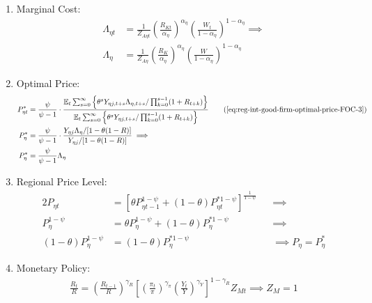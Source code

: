 \documentclass[../thesis.tex]{subfiles}
\begin{document}
\begin{enumerate}
	\item Marginal Cost:
	\begin{align}
		\Lambda_{\eta t} &= \frac{1}{Z_{A\eta t}} \left( \frac{R_{Kt}}{{\alpha_{\eta}}} \right)^{{\alpha_{\eta}}} \left( \frac{W_t}{1-{\alpha_{\eta}}} \right)^{1-{\alpha_{\eta}}} \implies \nonumber \\
		\Lambda_{\eta} &= \frac{1}{Z_{A\eta}} \left( \frac{R_K}{{\alpha_{\eta}}} \right)^{{\alpha_{\eta}}} \left( \frac{W}{1-{\alpha_{\eta}}} \right)^{1-{\alpha_{\eta}}} \label{eq:reg-ss-int-good-firm-MC-2}
	\end{align}
	
	\item Optimal Price:
	\begin{alignat}{2}
		P_{\eta t}^{\ast} &= \frac{\psi}{\psi-1} \cdot \frac{\E \sum_{s=0}^{\infty} \left\{\theta^s Y_{\eta j,t+s} \Lambda_{\eta, t+s} / \prod_{k=0}^{s-1}(1+R_{t+k}) \right\}} {\E \sum_{s=0}^{\infty} \left\{ \theta^s Y_{\eta j,t+s} / \prod_{k=0}^{s-1}(1+R_{t+k}) \right\}} \tag{\ref{eq:reg-int-good-firm-optimal-price-FOC-3}} \\
		P_{\eta}^{\ast} &= \frac{\psi}{\psi-1} \cdot \frac{ Y_{\eta j} \Lambda_{\eta} / [1-\theta(1-R)]} {Y_{\eta j} / [1-\theta(1-R)]} \implies \nonumber \\
		P_{\eta}^{\ast} &= \frac{\psi}{\psi-1} \Lambda_{\eta} \label{eq:reg-ss-int-good-firm-optimal-price-FOC-3}
	\end{alignat}
	
	\item Regional Price Level:
	\begin{alignat}{2}
		P_{\eta t} &= \left[ \theta P_{\eta t-1}^{1-\psi} + (1-\theta) P_{\eta t}^{\ast 1-\psi} \right]^\frac{1}{1-\psi} &&\implies \nonumber \\
		P_{\eta}^{1-\psi} &= \theta P_{\eta}^{1-\psi} + (1-\theta) P_{\eta}^{\ast 1-\psi} &&\implies \nonumber \\ 
		(1-\theta) P_{\eta}^{1-\psi} &= (1-\theta) P_{\eta}^{\ast 1-\psi} &&\implies P_{\eta} = P_{\eta}^{\ast} \label{eq:reg-ss-general-price-level}
	\end{alignat}
	
	\item Monetary Policy:
	\begin{align}
		\label{eq:reg-ss-monetary-policy}
		\frac{R_{t}}{R} =
		\left( \frac{R_{t-1}}{R} \right)^{\gamma_R}  \left[
		\left( \frac{\pi_t}{\pi} \right)^{\gamma_\pi}
		\left( \frac{Y_{t}}{Y} \right)^{\gamma_Y} \right]^{1-\gamma_R} Z_{Mt}
		\implies Z_{M} = 1
	\end{align}
	

\end{enumerate}
\end{document}
